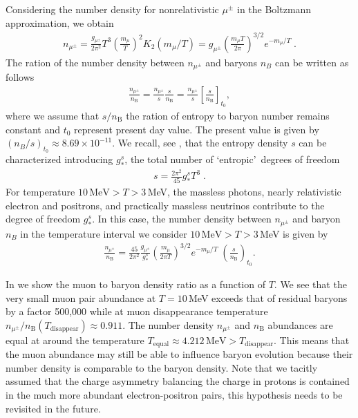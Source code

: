 Considering the number density for nonrelativistic $\mu^\pm$ in the Boltzmann approximation, we obtain
\begin{align}\label{nmupm}
n_{\mu^\pm}=\frac{g_{\mu^\pm}}{2\pi^2}T^3\left(\frac{m_\mu}{T}\right)^2 K_2(m_\mu/T)=g_{\mu^\pm}\left(\frac{m_\mu T}{2\pi}\right)^{3/2}e^{-{m_\mu}/{T}}\;. 
\end{align}
The ration of the number density between $n_{\mu^\pm}$ and baryons $n_B$ can be written as follows
\begin{align}
\frac{n_{\mu^\pm}}{n_\mathrm{B}}=\frac{n_{\mu^\pm}}{s}\frac{s}{n_\mathrm{B}}=
\frac{n_{\mu^\pm}}{s}\left[\frac{s}{n_\mathrm{B}}\right]_{t_0},
\end{align}
where we assume that $s/n_\mathrm{B}$ the ration of entropy to baryon number remains constant and $t_0$ represent present day value. The present value is given by $(n_B/s)_{t_0}\approx8.69\times10^{-11}$. We recall, see , that the entropy density $s$ can be characterized introducing $g^s_\ast$, the total number of \lq entropic\rq\ degrees of freedom
\begin{align}%
s=\frac{2\pi^2}{45}g^s_\ast T^3\;.
\end{align}
For temperature $10\,\mathrm{MeV} >T>3 $\,MeV, the massless photons, nearly relativistic electron and positrons, and practically massless neutrinos contribute to the degree of freedom $g^s_\ast$.  In this case, the number density between $n_{\mu^\pm}$ and baryon $n_B$ in the temperature interval we consider $10\,\mathrm{MeV} >T>3 $\,MeV is given by
\begin{align}\label{nmuperbF} 
\frac{n_{\mu^\pm}}{n_\mathrm{B}}=\frac{45}{2\pi^2}\frac{g_{\mu^\pm}}{g^s_\ast}\left(\frac{m_\mu}{2\pi T}\right)^{3/2}e^{-{m_\mu}/{T}}\;\left(\frac{s}{n_\mathrm{B}}\right)_{\!t_0}.
\end{align}

In  we show the muon to baryon density ratio  as a function of $T$. We see that the very small muon pair abundance at $T=10$\,MeV exceeds that of residual baryons by a factor 500,000 while at muon disappearance temperature $n_{\mu^\pm}/n_\mathrm{B}(T_\mathrm{disappear})\approx0.911$. The number density $n_{\mu^\pm}$ and $n_\mathrm{B}$  abundances are equal at around the temperature $T_\mathrm{equal}\approx4.212\,\mathrm{MeV} >  T_\mathrm{disappear}$.  This means that the muon abundance may still be able to influence baryon evolution because their number density is comparable to the baryon density. Note that we tacitly assumed that the charge asymmetry balancing the charge in protons is contained in the much more abundant electron-positron pairs, this hypothesis needs to be revisited in the future.

